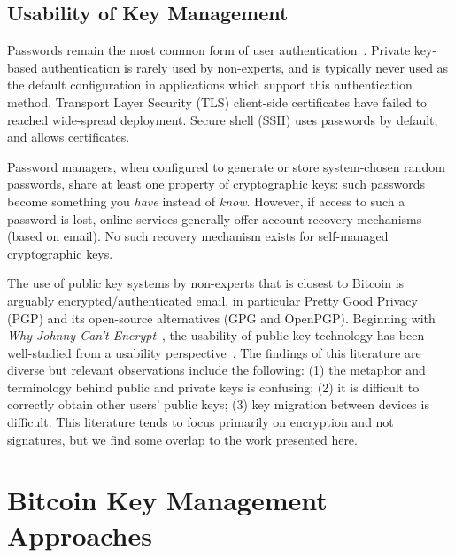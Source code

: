 \subsection{Usability of Key Management}

Passwords remain the most common form of user authentication~\cite{Herley.2012}. Private key-based authentication is rarely used by non-experts, and is typically never used as the default configuration in applications which support this authentication method. Transport Layer Security (TLS) client-side certificates have failed to reached wide-spread deployment. Secure shell (SSH) uses passwords by default, and allows certificates.



Password managers, when configured to generate or store system-chosen random passwords, share at least one property of cryptographic keys: such passwords become something you \emph{have} instead of \emph{know}. However, if access to such a password is lost, online services generally offer account recovery mechanisms (\eg based on email). No such recovery mechanism exists for self-managed cryptographic keys.

The use of public key systems by non-experts that is closest to Bitcoin is arguably encrypted/authenticated email, in particular Pretty Good Privacy (PGP) and its open-source alternatives (\ie GPG and OpenPGP). Beginning with \emph{Why Johnny Can't Encrypt}~\cite{WT99}, the usability of public key technology has been well-studied from a usability perspective~\cite{GM05,GMSN+05,SBKH06,GFF06}. The findings of this literature are diverse but relevant observations include the following: (1) the metaphor and terminology behind public and private keys is confusing; (2) it is difficult to correctly obtain other users' public keys; (3) key migration between devices is difficult. This literature tends to focus primarily on encryption and not signatures, but we find some overlap to the work presented here. 



\section{Bitcoin Key Management Approaches} 
\label{sec:approaches}

